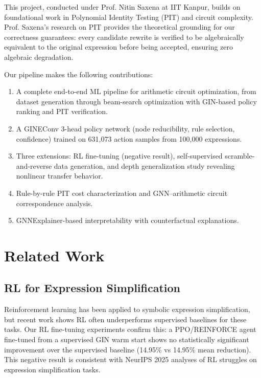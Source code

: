 \documentclass[10pt]{article}
\begin{document}
This project, conducted under Prof. Nitin Saxena at IIT Kanpur, builds on
foundational work in Polynomial Identity Testing (PIT) and circuit complexity.
Prof. Saxena's research on PIT provides the theoretical grounding for our
correctness guarantees: every candidate rewrite is verified to be algebraically
equivalent to the original expression before being accepted, ensuring zero
algebraic degradation.

Our pipeline makes the following contributions:

\begin{enumerate}
    \item A complete end-to-end ML pipeline for arithmetic circuit
          optimization, from dataset generation through beam-search optimization
          with GIN-based policy ranking and PIT verification.
    \item A GINEConv 3-head policy network (node reducibility, rule selection,
          confidence) trained on 631,073 action samples from 100,000 expressions.
    \item Three extensions: RL fine-tuning (negative result), self-supervised
          scramble-and-reverse data generation, and depth generalization study
          revealing nonlinear transfer behavior.
    \item Rule-by-rule PIT cost characterization and GNN–arithmetic circuit
          correspondence analysis.
    \item GNNExplainer-based interpretability with counterfactual explanations.
\end{enumerate}

\section{Related Work}

\subsection{RL for Expression Simplification}
Reinforcement learning has been applied to symbolic expression simplification,
but recent work shows RL often underperforms supervised baselines for these
tasks. Our RL fine-tuning experiments confirm this: a PPO/REINFORCE agent
fine-tuned from a supervised GIN warm start shows no statistically significant
improvement over the supervised baseline (14.95\% vs 14.95\% mean reduction).
This negative result is consistent with NeurIPS 2025 analyses of RL struggles
on expression simplification tasks.
\end{document}
